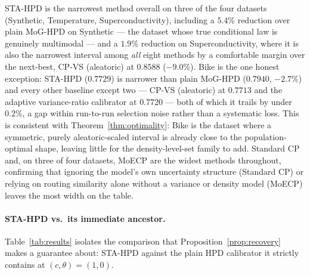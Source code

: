 \documentclass[10pt,twocolumn,a4paper]{article}
\begin{document}
STA-HPD is the narrowest method overall on three of the four datasets (Synthetic, Temperature,
Superconductivity), including a $5.4\%$ reduction over plain MoG-HPD on Synthetic — the dataset
whose true conditional law is genuinely multimodal — and a $1.9\%$ reduction on
Superconductivity, where it is also the narrowest interval among \emph{all} eight methods by a
comfortable margin over the next-best, CP-VS (aleatoric) at $0.8588$ ($-9.0\%$). Bike is the one
honest exception: STA-HPD ($0.7729$) is narrower than plain MoG-HPD ($0.7940$, $-2.7\%$) and every
other baseline except two — CP-VS (aleatoric) at $0.7713$ and the adaptive variance-ratio
calibrator at $0.7720$ — both of which it trails by under $0.2\%$, a gap within run-to-run
selection noise rather than a systematic loss. This is consistent with
Theorem~\ref{thm:optimality}: Bike is the dataset where a symmetric, purely aleatoric-scaled
interval is already close to the population-optimal shape, leaving little for the density-level-set
family to add. Standard CP and, on three of four datasets, MoECP are the widest methods throughout,
confirming that ignoring the model's own uncertainty structure (Standard CP) or relying on routing
similarity alone without a variance or density model (MoECP) leaves the most width on the table.

\paragraph{STA-HPD vs.\ its immediate ancestor.} Table~\ref{tab:results} isolates the comparison
that Proposition~\ref{prop:recovery} makes a guarantee about: STA-HPD against the plain HPD
calibrator it strictly contains at $(c,\theta)=(1,0)$.
\end{document}
